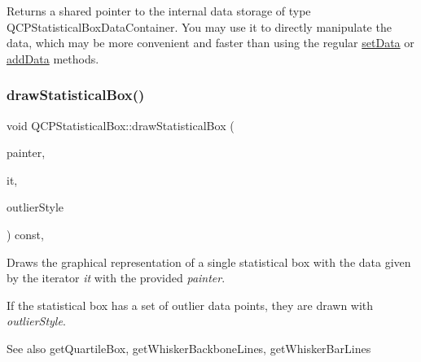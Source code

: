 Returns a shared pointer to the internal data storage of type Q\+C\+P\+Statistical\+Box\+Data\+Container. You may use it to directly manipulate the data, which may be more convenient and faster than using the regular \hyperlink{class_q_c_p_statistical_box_a08a6da55822bad825ee25a8069b9b52f}{set\+Data} or \hyperlink{class_q_c_p_statistical_box_a9a8739c5b8291db8fd839e892fc8f478}{add\+Data} methods. \mbox{\label{class_q_c_p_statistical_box_a02dc6b561be8203d460d7263da74b8a9}} 
\subsubsection{\texorpdfstring{draw\+Statistical\+Box()}{drawStatisticalBox()}}
{\footnotesize\ttfamily void Q\+C\+P\+Statistical\+Box\+::draw\+Statistical\+Box (\begin{DoxyParamCaption}\item[{\hyperlink{class_q_c_p_painter}{Q\+C\+P\+Painter} $\ast$}]{painter,  }\item[{Q\+C\+P\+Statistical\+Box\+Data\+Container\+::const\+\_\+iterator}]{it,  }\item[{const \hyperlink{class_q_c_p_scatter_style}{Q\+C\+P\+Scatter\+Style} \&}]{outlier\+Style }\end{DoxyParamCaption}) const\hspace{0.3cm}{\ttfamily [protected]}, {\ttfamily [virtual]}}

Draws the graphical representation of a single statistical box with the data given by the iterator {\itshape it} with the provided {\itshape painter}.

If the statistical box has a set of outlier data points, they are drawn with {\itshape outlier\+Style}.

\begin{DoxySeeAlso}{See also}
get\+Quartile\+Box, get\+Whisker\+Backbone\+Lines, get\+Whisker\+Bar\+Lines 
\end{DoxySeeAlso}
\mbox{\label{class_q_c_p_statistical_box_a77d2d13301dfe60c13adfaa17fc1802f}} 
